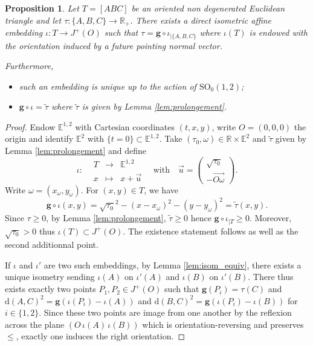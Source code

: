 \documentclass[a4paper,12pt]{article}
\def\E{\mathbf E}
\def\d{\mathrm{d}}
\def\SO{\mathrm{SO}}
\def\E{\mathbb{E}}
\def\RR{\mathbb{R}}
\newcommand{\mass}[1]{{\mathbb E}^{1,2}_{#1}}
\def\SO{\mathrm{SO}}
\def\quadform{\mathbf{g}}
\def\E{\mathbb{E}}
\def\d{\mathrm{d}}
\newcommand{\function}[5]{\displaystyle#1:\begin{array}{l|rcl}
& \displaystyle #2 & \longrightarrow & \displaystyle #3 \\
	& \displaystyle #4 & \longmapsto & \displaystyle #5 \end{array}}
\newtheorem{prop}[lem]{Proposition}
\theoremstyle{definition}
\begin{document}
							\begin{prop}\label{prop:affine_emb}
								Let $T=[ABC]$ be an oriented non degenerated Euclidean triangle and let $\tau: \{A,B,C\}\rightarrow \RR_+$. 
								There exists a direct isometric affine embedding $\iota: T\rightarrow J^+(O)$ such that $\tau = \quadform\circ \iota_{|\{A,B,C\}}$ where $\iota(T)$ is endowed with the orientation induced by a future pointing normal vector. 
								
								Furthermore, 
								\begin{itemize}
								 \item such an embedding is unique up to the action of $\SO_0(1,2)$;
								 \item $\quadform\circ \iota = \widetilde\tau$ where $\widetilde\tau$ is given by Lemma \ref{lem:prolongement}.
								 \end{itemize}

							\end{prop}
							\begin{proof}
								Endow $\mass{}$ with Cartesian coordinates $(t,x,y)$, write $O=(0,0,0)$ the origin and identify $\E^2$ with $\{t=0\}\subset \mass{}$.
								Take $(\tau_0,\omega)\in \RR\times \E^2$ and $\widetilde\tau$ given by Lemma \ref{lem:prolongement} and define $$ \function{\iota}{T}{\mass{}}{x}{x+
								\overrightarrow u} \quad \text{with} \quad 
								\overrightarrow u=\begin{pmatrix}\sqrt{\tau_0}\\ -\overrightarrow{O\omega}\end{pmatrix}.
	$$
								Write $\omega = (x_\omega,y_\omega)$. For $(x,y)\in T$, we have $$\quadform\circ \iota(x,y) = \sqrt{\tau_0}^2-(x-x_\omega)^2-(y-y_\omega)^2 = \widetilde\tau(x,y). $$
								Since $\tau\geq 0$, by Lemma \ref{lem:prolongement}, $\widetilde\tau\geq 0$ hence $\quadform\circ \iota_{|T}\geq0$. Moreover, $\sqrt{\tau_0}>0$ thus $\iota(T)\subset J^+(O)$. The existence statement follows as well as the second additionnal point.
								
								If $\iota$ and $\iota'$ are two such embeddings, by Lemma \ref{lem:isom_equiv}, there exists a unique isometry sending $\iota(A)$ on $\iota'(A)$ and $\iota(B)$ on $\iota'(B)$. There thus exists exactly two points $P_1,P_2\in J^+(O)$ such that $\quadform(P_i)=\tau(C)$ and $\d(A,C)^2 = \quadform(\iota(P_i)-\iota(A))$ and $\d(B,C)^2 = \quadform(\iota(P_i)-\iota(B))$
								for $i\in \{1,2\}$. Since these two points are image from one another by the reflexion across the plane $(O\,\iota(A)\,\iota(B))$ which is orientation-reversing and preserves $\leq$, exactly one induces the right orientation.\end{proof}
								
\end{document}
